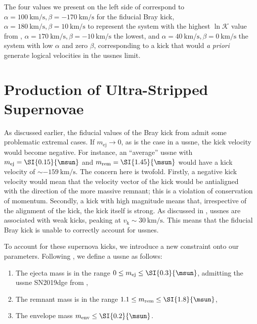 The four values we present on the left side of  correspond to $\alpha = \SI{100}{\km\per\s}, \beta=\SI{-170}{\km\per\s}$ for the fiducial Bray kick, $\alpha = \SI{180}{\km\per\s}, \beta = \SI{10}{\km\per\s}$ to represent the system with the highest $\ln\mathcal{K}$ value from , $\alpha = \SI{170}{\km\per\s}, \beta = \SI{-10}{\km\per\s}$ the lowest, and $\alpha = \SI{40}{\km\per\s}, \beta = \SI{0}{\km\per\s}$ the system with low $\alpha$ and zero $\beta$, corresponding to a kick that would \textit{a priori} generate logical velocities in the \glspl{ussne} limit.

\section{Production of Ultra-Stripped Supernovae}\label{sec:ussne_production}

As discussed earlier, the fiducial values of the Bray kick from \citet{Bray:2018} admit some problematic extremal cases. If $m_\text{ej}\to 0$, as is the case in a \gls{ussne}, the kick velocity would become negative. For instance, an ``average'' \gls{ussne} with $m_\text{ej}=\SI{0.15}{\msun}$ and $m_\text{rem}=\SI{1.45}{\msun}$ would have a kick velocity of $\sim\SI{-159}{\km\per\s}$. The concern here is twofold. Firstly, a negative kick velocity would mean that the velocity vector of the kick would be antialigned with the direction of the more massive remnant; this is a violation of conservation of momentum. Secondly, a kick with high magnitude means that, irrespective of the alignment of the kick, the kick itself is strong. As discussed in \citet{Willcox:2021}, \glspl{ussne} are associated with weak kicks, peaking at $v_\text{k}\sim\SI{30}{\km\per\s}$. This means that the fiducial Bray kick is unable to correctly account for \glspl{ussne}.

To account for these supernova kicks, we introduce a new constraint onto our parameters. Following \citet{Tauris:2015}, we define a \gls{ussne} as follows:

\begin{enumerate}
    \item The ejecta mass is in the range $0 \leq m_\text{ej} \leq \SI{0.3}{\msun}$, admitting the \gls{ussne} SN2019dge from \citet{Yao:2020},
    \item The remnant mass is in the range $1.1 \leq m_\text{rem} \leq \SI{1.8}{\msun}$,
    \item The envelope mass $m_\text{env}\leq\SI{0.2}{\msun}$.
\end{enumerate}

